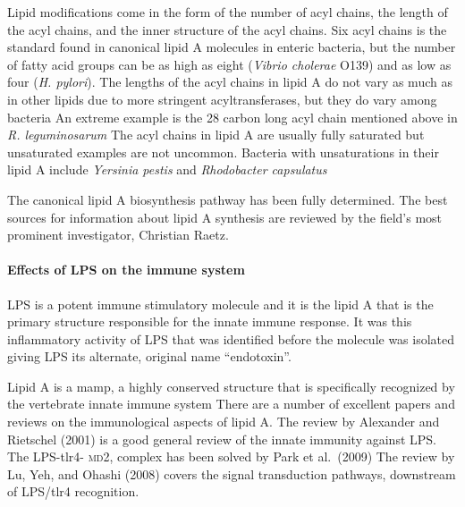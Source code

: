 Lipid modifications come in the form of the number of acyl chains, the length of the acyl chains, and the inner structure of the acyl chains. Six acyl chains is the standard found
in canonical lipid A molecules in enteric bacteria, but the number of fatty acid groups can be as high as eight (\eg \textit{Vibrio cholerae}
O139) and as low as four (\eg \textit{H. pylori}). The lengths of the acyl chains in lipid A do not vary
as much as in other lipids due to more stringent acyltransferases, but they do vary among bacteria An extreme example is the 28 carbon long acyl
chain mentioned above in \textit{R. leguminosarum} The acyl chains in lipid A are usually fully saturated but unsaturated examples are not uncommon.
Bacteria with unsaturations in their lipid A include \caulobacter{} \textit{Yersinia pestis} and \textit{Rhodobacter
capsulatus}

The canonical lipid A biosynthesis pathway has been fully determined. The best sources for information about lipid A synthesis are reviewed by the field's most prominent
investigator, Christian Raetz.

    \paragraph{Effects of \ac{LPS} on the immune system}

\ac{LPS} is a potent immune stimulatory molecule and it is the lipid A that is
the primary structure responsible for the innate immune response. It was this
inflammatory activity of \ac{LPS} that
was identified before the molecule was isolated giving \ac{LPS} its alternate, original name ``endotoxin''.

Lipid A is a \ac{mamp}, a highly conserved structure that is specifically recognized by the vertebrate innate immune system There are a number of
excellent papers and reviews on the immunological aspects of lipid A. The review by Alexander and Rietschel (2001) is a good general review of the
innate immunity against \ac{LPS}. The \ac{LPS}-\ac{tlr4}- \textsc{md}2, complex has been solved by Park et al.~(2009) The review by Lu, Yeh, and
Ohashi (2008) covers the signal transduction pathways, downstream of \ac{LPS}/\ac{tlr4} recognition.

